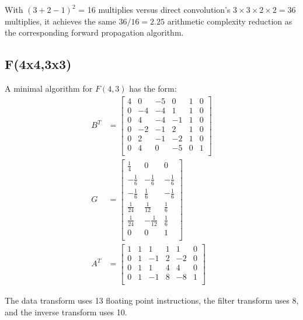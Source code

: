 \documentclass[10pt,twocolumn,letterpaper]{article}
\begin{document}
With $(3+2-1)^2$ = 16 multiplies versus direct convolution's $3 \times 3 \times 2 \times 2 = 36$ multiplies, it achieves the same $36/16 = 2.25$ arithmetic complexity reduction as the corresponding forward propagation algorithm. 

\subsection{F(4x4,3x3)}

A minimal algorithm for  $F(4, 3)$ has the form:
\begin{equation}\label{eq:F_4_3_matrices}
\begin{split}
B^T &= \left[
\begin{array}{rrrrrr}
 4 & 0 & -5 & 0 & 1 & 0 \\
 0 & -4 & -4 & 1 & 1 & 0 \\
 0 & 4 & -4 & -1 & 1 & 0 \\
 0 & -2 & -1 & 2 & 1 & 0 \\
 0 & 2 & -1 & -2 & 1 & 0 \\
 0 & 4 & 0 & -5 & 0 & 1 \\
\end{array}
\right] \\
G &= \left[
\begin{array}{rrr}
 \frac{1}{4} & 0 & 0 \\
 -\frac{1}{6} & -\frac{1}{6} & -\frac{1}{6} \\
 -\frac{1}{6} & \frac{1}{6} & -\frac{1}{6} \\
 \frac{1}{24} & \frac{1}{12} & \frac{1}{6} \\
 \frac{1}{24} & -\frac{1}{12} & \frac{1}{6} \\
 0 & 0 & 1 \\
\end{array}
\right] \\
A^T &= \left[
\begin{array}{rrrrrr}
 1 & 1 & 1 & 1 & 1 & 0 \\
 0 & 1 & -1 & 2 & -2 & 0 \\
 0 & 1 & 1 & 4 & 4 & 0 \\
 0 & 1 & -1 & 8 & -8 & 1 \\
\end{array}
\right]
\end{split}
\end{equation}

The data transform uses 13 floating point instructions, the filter transform uses 8, and the inverse transform uses 10.
\end{document}
